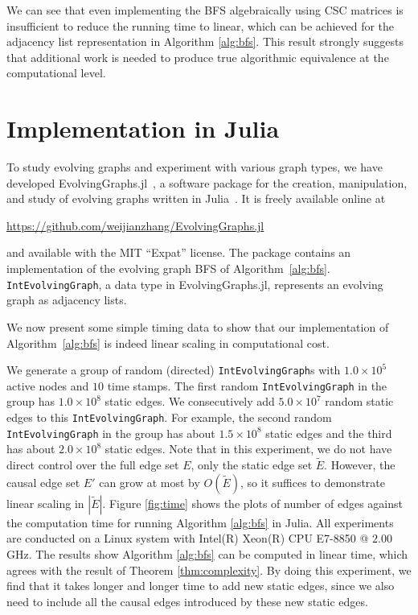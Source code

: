 \documentclass[10pt,conference,compsocconf]{IEEEtran}
\theoremstyle{definition}
\begin{document}
We can see that even implementing the BFS algebraically using CSC matrices is
insufficient to reduce the running time to linear, which can be achieved for
the adjacency list representation in Algorithm \ref{alg:bfs}.
This result strongly suggests that additional work is needed to produce true
algorithmic equivalence at the computational level.


\section{Implementation in Julia}
\label{sec:implementation-julia}

To study evolving graphs and experiment with various graph types, we have
developed EvolvingGraphs.jl~\cite{zhang15}, a software package for the creation,
manipulation, and study of evolving graphs written in Julia~\cite{bkse12}.
It is freely available online at
\begin{center}
\url{https://github.com/weijianzhang/EvolvingGraphs.jl}
\end{center}
and available with the MIT ``Expat'' license. The package contains an implementation
of the evolving graph BFS of Algorithm~\ref{alg:bfs}. \texttt{IntEvolvingGraph}, a data type in EvolvingGraphs.jl,
represents an evolving graph as adjacency lists.

We now present some simple timing data to show that our implementation of
Algorithm~\ref{alg:bfs} is indeed linear scaling in computational cost.

We generate a group of random (directed) \texttt{IntEvolvingGraph}s
with $1.0\times 10^5$ active nodes and $10$ time stamps.
The first random \texttt{IntEvolvingGraph} in the group has 
$1.0 \times 10^8$ static edges.
We consecutively add $5.0\times 10^7$
random static edges to this \texttt{IntEvolvingGraph}. For example, 
the second random \texttt{IntEvolvingGraph} in the group has about $1.5 \times 10^8$ static edges and the third
has about $2.0 \times 10^8$ static edges.
Note that in this experiment, we do not have direct control
over the full edge set $E$, only the static edge set $\tilde E$. However, the
causal edge set $E'$ can grow at most by $O(\tilde E)$, so it suffices to demonstrate
linear scaling in $|\tilde E|$. 
Figure \ref{fig:time} shows the plots of number of edges against the computation time
for running Algorithm \ref{alg:bfs} in Julia. All experiments are conducted
on a Linux system with Intel(R) Xeon(R) CPU E7-8850 @ $2.00$GHz.
The results show Algorithm \ref{alg:bfs} can be computed in linear time, which agrees
with the result of Theorem \ref{thm:complexity}.
By doing this experiment, we find that it takes longer and longer time to 
add new static edges, since we also need to include
all the causal edges introduced by these new static edges.
\end{document}
